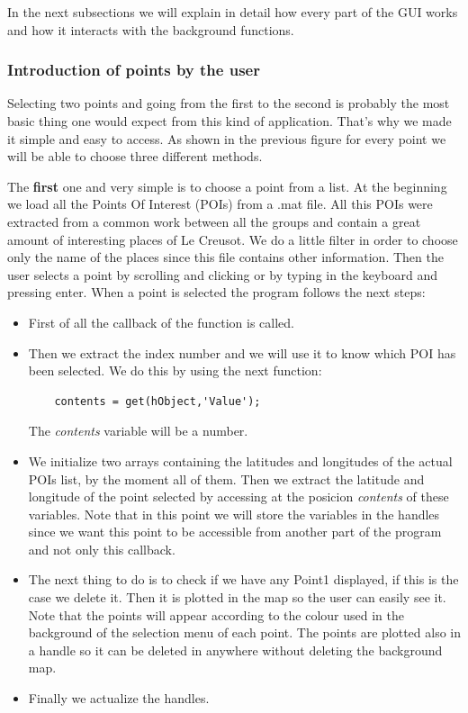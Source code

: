 \documentclass{article}
\begin{document}
In the next subsections we will explain in detail how every part of the GUI works and how it interacts with the background functions.

\subsubsection{Introduction of points by the user}
Selecting two points and going from the first to the second is probably the most basic thing one would expect from this kind of application. That's why we made it simple and easy to access. As shown in the previous figure for every point we will be able to choose three different methods. 

The \textbf{first} one and very simple is to choose a point from a list. At the beginning we load all the Points Of Interest (POIs) from a .mat file. All this POIs were extracted from a common work between all the groups and contain a great amount of interesting places of Le Creusot. We do a little filter in order to choose only the name of the places since this file contains other information. Then the user selects a point by scrolling and clicking or by typing in the keyboard and pressing enter. When a point is selected the program follows the next steps:

\begin{itemize}
\item
First of all the callback of the function is called.
\item
Then we extract the index number and we will use it to know which POI has been selected. We do this by using the next function:
	\begin{lstlisting}
	contents = get(hObject,'Value');
	\end{lstlisting}
The \textit{contents} variable will be a number.
\item
We initialize two arrays containing the latitudes and longitudes of the actual POIs list, by the moment all of them. Then we extract the latitude and longitude of the point selected by accessing at the posicion \textit{contents} of these variables. Note that in this point we will store the variables in the handles since we want this point to be accessible from another part of the program and not only this callback.
\item
The next thing to do is to check if we have any Point1 displayed, if this is the case we delete it. Then it is plotted in the map so the user can easily see it. Note that the points will appear according to the colour used in the background of the selection menu of each point. The points are plotted also in a handle so it can be deleted in anywhere without deleting the background map.
\item
Finally we actualize the handles.
\end{itemize} 
\end{document}
